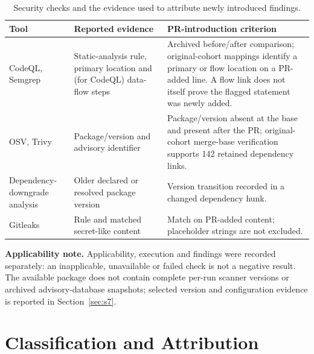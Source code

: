 \begin{table}[H]
\caption{Security checks and the evidence used to attribute newly introduced findings.}
\label{tab:scanners}
\footnotesize\renewcommand{\arraystretch}{1.13}
\begin{tabularx}{\linewidth}{@{}L{2.5cm}L{3.25cm}Y@{}}
\toprule
\textbf{Tool} & \textbf{Reported evidence} & \textbf{PR-introduction criterion}\\
\midrule
CodeQL, Semgrep & Static-analysis rule, primary location and (for CodeQL) data-flow steps & Archived before/after comparison; original-cohort mappings identify a primary or flow location on a PR-added line. A flow link does not itself prove the flagged statement was newly added.\\
OSV, Trivy & Package/version and advisory identifier & Package/version absent at the base and present after the PR; original-cohort merge-base verification supports 142 retained dependency links.\\
Dependency-downgrade analysis & Older declared or resolved package version & Version transition recorded in a changed dependency hunk.\\
Gitleaks & Rule and matched secret-like content & Match on PR-added content; placeholder strings are not excluded.\\
\bottomrule
\end{tabularx}
\par\smallskip\raggedright\scriptsize
\textbf{Applicability note.} Applicability, execution and findings were recorded separately: an inapplicable, unavailable or failed check is not a negative result. The available package does not contain complete per-run scanner versions or archived advisory-database snapshots; selected version and configuration evidence is reported in Section~\ref{sec:s7}.
\end{table}

\FloatBarrier
\section{Classification and Attribution}\label{sec:s2}


